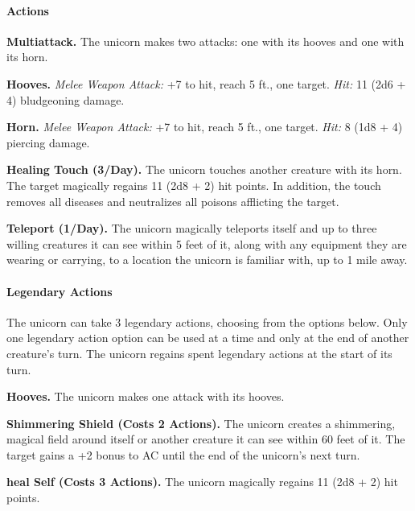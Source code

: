 \documentclass[
]{article}
\begin{document}
\hypertarget{actions}{%
\paragraph{Actions}\label{actions}}

\textbf{Multiattack.} The unicorn makes two attacks: one with its hooves
and one with its horn.

\textbf{Hooves.} \emph{Melee Weapon Attack:} +7 to hit, reach 5 ft., one
target. \emph{Hit:} 11 (2d6 + 4) bludgeoning damage.

\textbf{Horn.} \emph{Melee Weapon Attack:} +7 to hit, reach 5 ft., one
target. \emph{Hit:} 8 (1d8 + 4) piercing damage.

\textbf{Healing Touch (3/Day).} The unicorn touches another creature
with its horn. The target magically regains 11 (2d8 + 2) hit points. In
addition, the touch removes all diseases and neutralizes all poisons
afflicting the target.

\textbf{Teleport (1/Day).} The unicorn magically teleports itself and up
to three willing creatures it can see within 5 feet of it, along with
any equipment they are wearing or carrying, to a location the unicorn is
familiar with, up to 1 mile away.

\hypertarget{legendary-actions}{%
\paragraph{Legendary Actions}\label{legendary-actions}}

The unicorn can take 3 legendary actions, choosing from the options
below. Only one legendary action option can be used at a time and only
at the end of another creature's turn. The unicorn regains spent
legendary actions at the start of its turn.

\textbf{Hooves.} The unicorn makes one attack with its hooves.

\textbf{Shimmering Shield (Costs 2 Actions).} The unicorn creates a
shimmering, magical field around itself or another creature it can see
within 60 feet of it. The target gains a +2 bonus to AC until the end of
the unicorn's next turn.

\textbf{heal Self (Costs 3 Actions).} The unicorn magically regains 11
(2d8 + 2) hit points.
\end{document}
